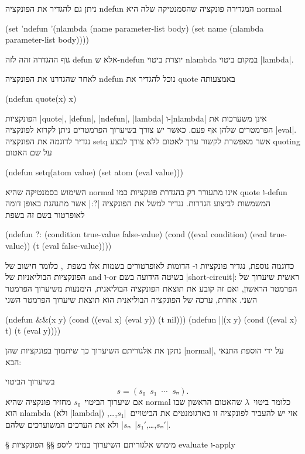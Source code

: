 ניתן גם להגדיר את הפונקציה ndefun המגדירה פונקציה שהסמנטיקה שלה היא normal
\begin{LIBRARY}
(set 'ndefun
  '(nlambda (name parameter-list body)
    (set name (nlambda parameter-list body))))
\end{LIBRARY}
גוף ההגדרה זהה לזה defun אלא ש-ndefun יוצרת ביטוי nlambda במקום ביטוי
\E|lambda|.

לאחר שהגדרנו את הפונקציה ndefun נוכל להגדיר את quote באמצעותה
\begin{LISP}
(ndefun quote(x) x)
\end{LISP}
הפונקציות \E|quote|, \E|defun|, \E|ndefun|, \E|lambda| ו-\E|nlambda| אינן
משערכות את הפרמטרים שלהן אף פעם. כאשר יש צורך בשיערוך הפרמטרים ניתן לקרוא
לפונקציה \E|eval|. נגדיר לדוגמה את הפונקציה setq אשר מאפשרת לקשור ערך לאטום ללא
צורך לבצע quoting על שם האטום
\begin{LISP}
(ndefun setq(atom value)
  (set atom (eval value)))
\end{LISP}
השימוש בסמנטיקה שהיא normal אינו מתעורר רק בהגדרת פונקציות כמו quote ו-defun
המשמשות לביצוע הגדרות. נגדיר למשל את הפונקציה \T|?:| אשר מתנהגת באופן דומה
לאופרטור בשם זה בשפת~\CPL
\begin{LISP}
(ndefun ?: (condition true-value false-value)
  (cond ((eval condition) (eval true-value))
        (t (eval false-value))))
\end{LISP}
כדוגמה נוספת, נגדיר פונקציות \lisp{||} ו-\lisp{&&} הדומות לאופרטורים בשמות אלו
בשפת~\CPL, כלומר חישוב של הפונקציות הבוליאניות של and ו-or בשיטה הידועה בשם
\E|short-circuit|: ראשית שיערוך של הפרמטר הראשון, ואם זה קובע את תוצאת הפונקציה
הבוליאנית, הימנעות משיערוך הפרמטר השני. אחרת, ערכה של הפונקציה הבוליאנית הוא תוצאת
שיערוך הפרמטר השני
\begin{LISP}
(ndefun &&(x y)
  (cond ((eval x) (eval y))
        (t nil)))
(ndefun ||(x y)
  (cond ((eval x) t)
        (t (eval y))))
\end{LISP}

נתקן את אלגוריתם השיערוך כך שיתמוך בפונקציות שהן \E|normal|, על ידי הוספת התנאי
הבא:
\begin{mdframed}[backgroundcolor=Lavender!20]
  בשיערוך הביטוי \[
    s=(s₀\;\;s₁\;\;⋯\;\;sₙ).
\] אם שיערוך הביטוי~$s₀$ מחזיר פונקציה שהיא
  normal כלומר ביטוי~$λ$ שהאטום הראשון שבו הוא nlambda (ולא \E|lambda|) אזי יש
  להעביר לפונקציה זו כארגומנטים את הביטויים~\E|$s₁$,…,$sₙ$| ולא את הערכים
  המשוערכים שלהם~\E|$s₁'$,…,$sₙ'$|.
\end{mdframed}

§ מימוש אלגוריתם השיערוך במיני ליספ
§§ הפונקציות evaluate ו-apply

